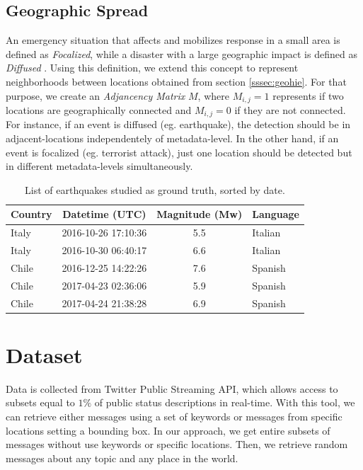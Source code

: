 \documentclass[sigconf]{acmart}
\begin{document}
\subsection{Geographic Spread}\label{sssec:geospread}

An emergency situation that affects and mobilizes response in a small area is defined as \textit{Focalized}, while a disaster with a large geographic impact is defined as \textit{Diffused} \cite{olteanu2015expect}. Using this definition, we extend this concept to represent neighborhoods between locations obtained from section \ref{sssec:geohie}. For that purpose, we create an \textit{Adjancency Matrix} $M$, where $M_{i,j} = 1$ represents if two locations are geographically connected and $M_{i,j} = 0$ if they are not connected. For instance, if an event is diffused (eg. earthquake), the detection should be in adjacent-locations independentely of metadata-level. In the other hand, if an event is focalized (eg. terrorist attack), just one location should be detected but in different metadata-levels simultaneously.


\begin{table}
	\caption{List of earthquakes studied as ground truth, sorted by date.}
	\label{tab:eqs}
	\begin{tabular}{lccl}
		\toprule
		Country&Datetime (UTC)&Magnitude (Mw)& Language\\
		\midrule
		Italy & 2016-10-26 17:10:36 & 5.5 & Italian \\
		Italy & 2016-10-30 06:40:17 & 6.6 & Italian\\
		Chile & 2016-12-25 14:22:26 & 7.6 & Spanish\\
		Chile & 2017-04-23 02:36:06 & 5.9 & Spanish\\
		Chile & 2017-04-24 21:38:28 & 6.9 & Spanish\\
		\midrule
	\end{tabular}
\end{table}

\section{Dataset}

Data is collected from Twitter Public Streaming API, which allows access to subsets equal to $1\%$ of public status descriptions in real-time. With this tool, we can retrieve either messages using a set of keywords or messages from specific locations setting a bounding box. In our approach, we get entire subsets of messages without use keywords or specific locations. Then, we retrieve random messages about any topic and any place in the world.
 
\end{document}
